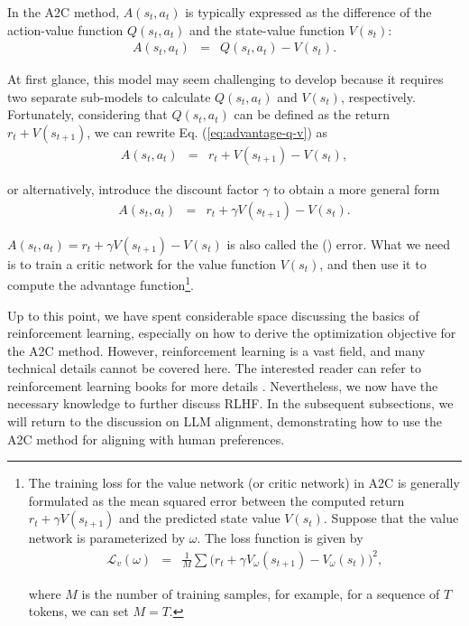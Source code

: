 In the A2C method, $A(s_t,a_t)$ is typically expressed as the difference of the action-value function $Q(s_t,a_t)$ and the state-value function $V(s_t)$:
\begin{eqnarray}
A(s_t,a_t) & = & Q(s_t,a_t) - V(s_t). \label{eq:advantage-q-v}
\end{eqnarray}

\noindent At first glance, this model may seem challenging to develop because it requires two separate sub-models to calculate $Q(s_t,a_t)$ and $V(s_t)$, respectively. Fortunately, considering that $Q(s_t,a_t)$ can be defined as the return $r_t + V(s_{t+1})$, we can rewrite Eq. (\ref{eq:advantage-q-v}) as
\begin{eqnarray}
A(s_t,a_t) & = & r_t + V(s_{t+1}) - V(s_t),
\end{eqnarray}

\noindent or alternatively, introduce the discount factor $\gamma$ to obtain a more general form
\begin{eqnarray}
A(s_t,a_t) & = & r_t + \gamma V(s_{t+1}) - V(s_t).
\end{eqnarray}

\noindent $A(s_t,a_t) = r_t + \gamma V(s_{t+1}) - V(s_t)$ is also called the  () error. What we need is to train a critic network for the value function $V(s_t)$, and then use it to compute the advantage function\footnote{The training loss for the value network (or critic network) in A2C is generally formulated as the mean squared error between the computed return $r_t + \gamma V(s_{t+1})$ and the predicted state value $V(s_t)$. Suppose that the value network is parameterized by $\omega$. The loss function is given by
\begin{eqnarray}
\mathcal{L}_v(\omega) & = & \frac{1}{M} \sum \big(r_t + \gamma V_{\omega}(s_{t+1}) - V_{\omega}(s_t) \big)^2,
\end{eqnarray}

\noindent where $M$ is the number of training samples, for example, for a sequence of $T$ tokens, we can set $M=T$.
}.

Up to this point, we have spent considerable space discussing the basics of reinforcement learning, especially on how to derive the optimization objective for the A2C method. However, reinforcement learning is a vast field, and many technical details cannot be covered here. The interested reader can refer to reinforcement learning books for more details \cite{Sutton-and-Barto:2018RL,szepesvari:2010algorithms}. Nevertheless, we now have the necessary knowledge to further discuss RLHF. In the subsequent subsections, we will return to the discussion on LLM alignment, demonstrating how to use the A2C method for aligning with human preferences.

